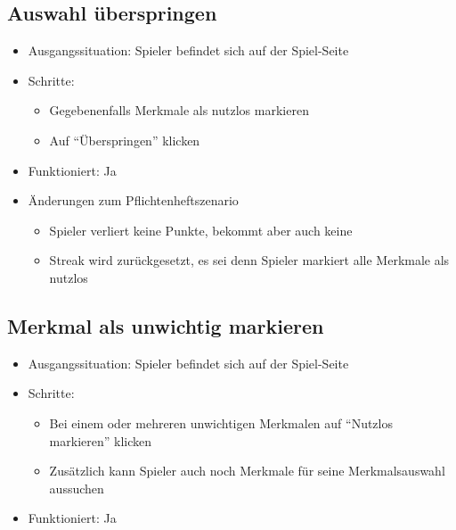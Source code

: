 \documentclass[a4paper]{scrreprt}
\begin{document}
            \subsection{Auswahl überspringen}
            \begin{itemize}
                \item Ausgangssituation: Spieler befindet sich auf der Spiel-Seite
                \item Schritte:
                    \begin{itemize}
                        \item Gegebenenfalls Merkmale als nutzlos markieren
                        \item Auf \enquote{Überspringen} klicken
                    \end{itemize}
                \item Funktioniert: Ja
                \item Änderungen zum Pflichtenheftszenario
                \begin{itemize}
                    \item Spieler verliert keine Punkte, bekommt aber auch keine
                    \item Streak wird zurückgesetzt, es sei denn Spieler markiert alle Merkmale als nutzlos
                \end{itemize}
            \end{itemize}

            \subsection{Merkmal als unwichtig markieren}
            \begin{itemize}
                \item Ausgangssituation: Spieler befindet sich auf der Spiel-Seite
                \item Schritte:
                    \begin{itemize}
                        \item Bei einem oder mehreren unwichtigen Merkmalen auf \enquote{Nutzlos markieren} klicken
                        \item Zusätzlich kann Spieler auch noch Merkmale für seine Merkmalsauswahl aussuchen
                    \end{itemize}
                \item Funktioniert: Ja
            \end{itemize}
\end{document}
